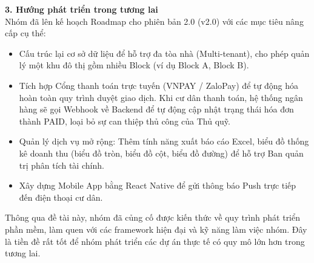 \documentclass[12pt,a4paper]{article}
\begin{document}
\textbf{3. Hướng phát triển trong tương lai} \\
Nhóm đã lên kế hoạch Roadmap cho phiên bản 2.0 (v2.0) với các mục tiêu nâng cấp cụ thể:
\begin{itemize}
    \item Cấu trúc lại cơ sở dữ liệu để hỗ trợ đa tòa nhà (Multi-tenant), cho phép quản lý một khu đô thị gồm nhiều Block (ví dụ Block A, Block B).
    \item Tích hợp Cổng thanh toán trực tuyến (VNPAY / ZaloPay) để tự động hóa hoàn toàn quy trình duyệt giao dịch. Khi cư dân thanh toán, hệ thống ngân hàng sẽ gọi Webhook về Backend để tự động cập nhật trạng thái hóa đơn thành PAID, loại bỏ sự can thiệp thủ công của Thủ quỹ.
    \item Quản lý dịch vụ mở rộng: Thêm tính năng xuất báo cáo Excel, biểu đồ thống kê doanh thu (biểu đồ tròn, biểu đồ cột, biểu đồ đường) để hỗ trợ Ban quản trị phân tích tài chính.
    \item Xây dựng Mobile App bằng React Native để gửi thông báo Push trực tiếp đến điện thoại cư dân.
\end{itemize}

Thông qua đề tài này, nhóm đã củng cố được kiến thức về quy trình phát triển phần mềm, làm quen với các framework hiện đại và kỹ năng làm việc nhóm. Đây là tiền đề rất tốt để nhóm phát triển các dự án thực tế có quy mô lớn hơn trong tương lai.
\end{document}
